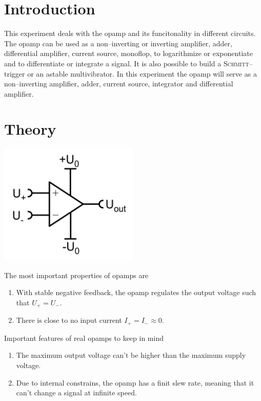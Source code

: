 \documentclass[a4paper,10pt]{article}
\newenvironment{Figure}
        {\par\medskip\noindent\minipage{\linewidth}}
        {\endminipage\par\medskip}
\numberwithin{equation}{section}
\begin{document}
\begin{multicols}{2}

	\section{Introduction}
	This experiment deals with the opamp and its funcitonality in different circuits.
	The opamp can be used as a non--inverting or inverting amplifier, adder, differential amplifier, current source, monoflop, to logarithmize or exponentiate and to differentiate or integrate a signal.
	It is also possible to build a \textsc{Schmitt}--trigger or an astable multivibrator.
	In this experiment the opamp will serve as a non--inverting amplifier, adder, current source, integrator and differential amplifier.

	\section{Theory}
	\begin{Figure}
		\centering
		\includegraphics[width=0.5\textwidth]{opamp.png}
	\end{Figure}
	\noindent The most important properties of opamps are
	\begin{enumerate}[label=--]
		\item With stable negative feedback, the opamp regulates the output voltage such that $U_+=U_-$.
		\item There is close to no input current $I_+=I_-\approx 0$.
	\end{enumerate}
	Important features of real opamps to keep in mind
	\begin{enumerate}[label=--]
		\item The maximum output voltage can't be higher than the maximum supply voltage.
		\item Due to internal constrains, the opamp has a finit slew rate, meaning that it can't change a signal at infinite speed.

\end{enumerate}
\end{multicols}
\end{document}
